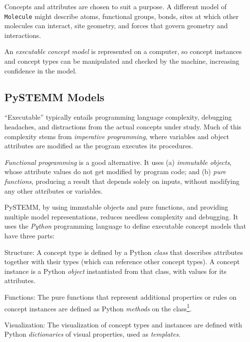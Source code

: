 \documentclass[letterpaper,compsoc,twoside]{IEEEtran}
\providecommand*{\DUfootnotemark}[3]{\raisebox{1em}{\hypertarget{#1}{}}\hyperlink{#2}{\textsuperscript{#3}}}
\begin{document}
Concepts and attributes are chosen to suit a purpose. A different model of \texttt{Molecule} might describe atoms, functional groups, bonds, sites at which other molecules can interact, site geometry, and forces that govern geometry and interactions.

An \emph{executable concept model} is represented on a computer, so concept instances and concept types can be manipulated and checked by the machine, increasing confidence in the model.

\subsection{PySTEMM Models\label{pystemm-models}}




“Executable” typically entails programming language complexity, debugging headaches, and distractions from the actual concepts under study. Much of this complexity stems from \emph{imperative programming}, where variables and object attributes are modified as the program executes its procedures.

\emph{Functional programming} is a good alternative. It uses (a) \emph{immutable objects}, whose attribute values do not get modified by program code; and (b) \emph{pure functions}, producing a result that depends solely on inputs, without modifying any other attributes or variables.

PySTEMM, by using immutable objects and pure functions, and providing multiple model representations, reduces needless complexity and debugging. It uses the \emph{Python} programming language to define executable concept models that have three parts:
\begin{list}{.}
{
\setlength{\rightmargin}{\leftmargin}
}

\item 

Structure: A concept type is defined by a Python \emph{class} that describes attributes together with their types (which can reference other concept types). A concept instance is a Python \emph{object} instantiated from that class, with values for its attributes.
\item 

Functions: The pure functions that represent additional properties or rules on concept instances are defined as Python \emph{methods} on the class\DUfootnotemark{id3}{id4}{1}.
\item 

Visualization: The visualization of concept types and instances are defined with Python \emph{dictionaries} of visual properties, used as \emph{templates}.\end{list}
\end{document}
